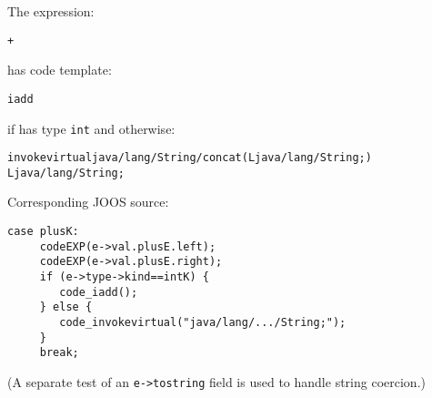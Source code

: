 \begin{slide*}
The expression:
 
\begin{scriptsize}
\begin{alltt}
     + 
\end{alltt}
\end{scriptsize}
 
has code template:
 
\begin{scriptsize}
\begin{alltt}
    iadd
\end{alltt}
\end{scriptsize}

if  has type {\tt int} and otherwise:

\begin{scriptsize}
\begin{alltt}
    invokevirtual {\tiny\rm java/lang/String/concat(Ljava/lang/String;)
                                                   Ljava/lang/String;}
\end{alltt}
\end{scriptsize}

Corresponding JOOS source:
 
\begin{scriptsize}
\begin{verbatim}
case plusK:
     codeEXP(e->val.plusE.left);
     codeEXP(e->val.plusE.right);
     if (e->type->kind==intK) {
        code_iadd();
     } else {
        code_invokevirtual("java/lang/.../String;");
     }
     break;
\end{verbatim}
\end{scriptsize}

(A separate test of an {\tt e->tostring} field is used to handle string coercion.)

\vfil
\end{slide*}

